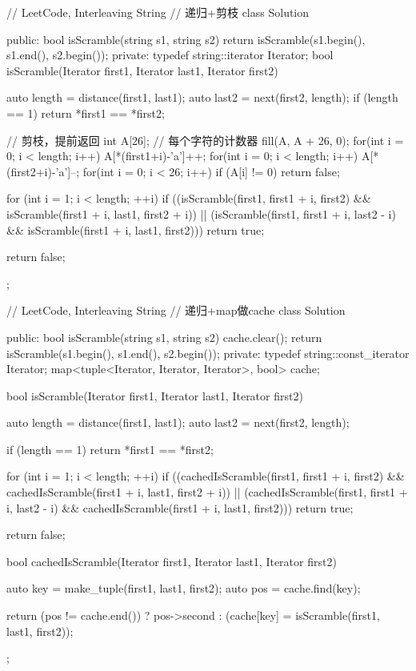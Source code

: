 \begin{Code}
// LeetCode, Interleaving String
// 递归+剪枝
class Solution {
public:
    bool isScramble(string s1, string s2) {
        return isScramble(s1.begin(), s1.end(), s2.begin());
    }
private:
    typedef string::iterator Iterator;
    bool isScramble(Iterator first1, Iterator last1, Iterator first2) {
        auto length = distance(first1, last1);
        auto last2 = next(first2, length);
        if (length == 1) return *first1 == *first2;

        // 剪枝，提前返回
        int A[26]; // 每个字符的计数器
        fill(A, A + 26, 0);
        for(int i = 0; i < length; i++) A[*(first1+i)-'a']++;
        for(int i = 0; i < length; i++) A[*(first2+i)-'a']--;
        for(int i = 0; i < 26; i++) if (A[i] != 0) return false;

        for (int i = 1; i < length; ++i)
            if ((isScramble(first1, first1 + i, first2)
                 && isScramble(first1 + i, last1, first2 + i))
                    || (isScramble(first1, first1 + i, last2 - i)
                            && isScramble(first1 + i, last1, first2)))
                return true;

        return false;
    }
};
\end{Code}

\begin{Code}
// LeetCode, Interleaving String
// 递归+map做cache
class Solution {
public:
    bool isScramble(string s1, string s2) {
        cache.clear();
        return isScramble(s1.begin(), s1.end(), s2.begin());
    }
private:
    typedef string::const_iterator Iterator;
    map<tuple<Iterator, Iterator, Iterator>, bool> cache;

    bool isScramble(Iterator first1, Iterator last1, Iterator first2) {
        auto length = distance(first1, last1);
        auto last2 = next(first2, length);

        if (length == 1) return *first1 == *first2;

        for (int i = 1; i < length; ++i)
            if ((cachedIsScramble(first1, first1 + i, first2)
                    && cachedIsScramble(first1 + i, last1, first2 + i))
                    || (cachedIsScramble(first1, first1 + i, last2 - i)
                            && cachedIsScramble(first1 + i, last1, first2)))
                return true;

        return false;
    }

    bool cachedIsScramble(Iterator first1, Iterator last1, Iterator first2) {
        auto key = make_tuple(first1, last1, first2);
        auto pos = cache.find(key);

        return (pos != cache.end()) ?
                pos->second : (cache[key] = isScramble(first1, last1, first2));
    }
};
\end{Code}

